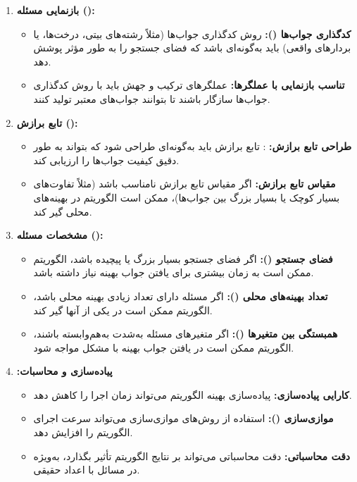 \documentclass[12pt]{exam}
\begin{document}
\begin{questions}
\begin{parts}
\begin{enumerate}
	 	\item \textbf{بازنمایی مسئله ():}
	 	
	 		\begin{itemize}
	 		\item \textbf{کدگذاری جواب‌ها ():}
	 		روش کدگذاری جواب‌ها (مثلاً رشته‌های بیتی، درخت‌ها، یا بردارهای واقعی) باید به‌گونه‌ای باشد که فضای جستجو را به طور مؤثر پوشش دهد.
	 		\item \textbf{تناسب بازنمایی با عملگرها:}
	 		عملگرهای ترکیب و جهش باید با روش کدگذاری جواب‌ها سازگار باشند تا بتوانند جواب‌های معتبر تولید کنند.
	 	\end{itemize}
	 \item \textbf{تابع برازش ():}
	 
	 \begin{itemize}
	 	\item \textbf{طراحی تابع برازش:}
	 	: تابع برازش باید به‌گونه‌ای طراحی شود که بتواند به طور دقیق کیفیت جواب‌ها را ارزیابی کند.
	 	\item \textbf{مقیاس تابع برازش:}
	 	اگر مقیاس تابع برازش نامناسب باشد (مثلاً تفاوت‌های بسیار کوچک یا بسیار بزرگ بین جواب‌ها)، ممکن است الگوریتم در بهینه‌های محلی گیر کند.
	 	
	 \end{itemize}
	 
	 \item \textbf{مشخصات مسئله ():}
	 
	 \begin{itemize}
	 	\item \textbf{فضای جستجو (): }
	 	اگر فضای جستجو بسیار بزرگ یا پیچیده باشد، الگوریتم ممکن است به زمان بیشتری برای یافتن جواب بهینه نیاز داشته باشد.
	 	\item \textbf{تعداد بهینه‌های محلی (): }
	 	اگر مسئله دارای تعداد زیادی بهینه محلی باشد، الگوریتم ممکن است در یکی از آنها گیر کند.
	 	
	 	\item \textbf{همبستگی بین متغیرها (): }
	 	اگر متغیرهای مسئله به‌شدت به‌هم‌وابسته باشند، الگوریتم ممکن است در یافتن جواب بهینه با مشکل مواجه شود.
	 	
	 \end{itemize}
	 
	 \item \textbf{:پیاده‌سازی و محاسبات}
	 
	 \begin{itemize}
	 	\item \textbf{کارایی پیاده‌سازی: }
	 	پیاده‌سازی بهینه الگوریتم می‌تواند زمان اجرا را کاهش دهد.
	 	\item \textbf{موازی‌سازی (): }
	 	استفاده از روش‌های موازی‌سازی می‌تواند سرعت اجرای الگوریتم را افزایش دهد.
	 	\item \textbf{دقت محاسباتی: }
	 	دقت محاسباتی می‌تواند بر نتایج الگوریتم تأثیر بگذارد، به‌ویژه در مسائل با اعداد حقیقی.
	 \end{itemize}
	 

\end{enumerate}
\end{parts}
\end{questions}
\end{document}
